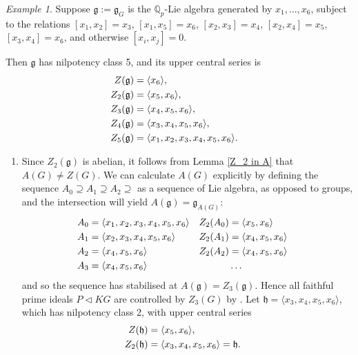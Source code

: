 \documentclass[12pt,a4paper]{article}
\let\\=\cr
\theoremstyle{definition}
\theoremstyle{remark}
\newtheorem{ex}[thm]{Example}
\theoremstyle{custthm}
\newcommand{\red}[1]{\textcolor{red!70!black}{\marginnote{\hspace{20pt}\dangertriangle}#1}}
\newcommand\dangertriangle{%
 \makebox[1.4em][c]{%
 \makebox[0pt][c]{\raisebox{.1em}{\small{\textbf{!}}}}%
 \makebox[0pt][c]{\Large$\bigtriangleup$}}}%
\begin{document}

\begin{ex}
Suppose $\mathfrak{g}:=\mathfrak{g}_G$ is the $\mathbb{Q}_p$-Lie algebra generated by $x_1, \dots, x_6$, subject to the relations 
$[x_1,x_2] = x_3$, $[x_1,x_5] = x_6$, $[x_2,x_3] = x_4$, $[x_2,x_4] = x_5$, $[x_3,x_4] = x_6$, and otherwise $[x_i, x_j] = 0$.

Then $\mathfrak{g}$ has nilpotency class 5, and its upper central series is
\begin{align*}
Z(\mathfrak{g}) &= \langle x_6\rangle,\\
Z_2(\mathfrak{g}) &= \langle x_5,x_6\rangle,\\
Z_3(\mathfrak{g}) &= \langle x_4,x_5,x_6\rangle,\\
Z_4(\mathfrak{g}) &= \langle x_3,x_4,x_5,x_6\rangle,\\
Z_5(\mathfrak{g}) &= \langle x_1,x_2,x_3,x_4,x_5,x_6\rangle.
\end{align*}
%

\begin{enumerate}[label=(\roman*)]
\item Since $Z_2(\mathfrak{g})$ is abelian, it follows from Lemma \ref{Z_2 in A} that $A(G)\neq Z(G)$. We can calculate $A(G)$ explicitly by defining the sequence $A_0\supseteq A_1\supseteq A_2\supseteq$ as a sequence of Lie algebra, as opposed to groups, and the intersection will yield $A(\mathfrak{g})=\mathfrak{g}_{A(G)}$:
%
\begin{align*}
A_0 &= \langle x_1,x_2,x_3,x_4,x_5,x_6\rangle &
Z_2(A_0) &= \langle x_5,x_6\rangle \\
A_1 &= \langle x_2,x_3,x_4,x_5,x_6\rangle &
Z_2(A_1) &= \langle x_4,x_5,x_6\rangle \\
A_2 &= \langle x_4,x_5,x_6\rangle &
Z_2(A_2) &= \langle x_4,x_5,x_6\rangle \\
A_3 &= \langle x_4,x_5,x_6\rangle && \dots
\end{align*}
%
and so the sequence has stabilised at $A(\mathfrak{g}) = Z_3(\mathfrak{g})$. Hence all faithful prime ideals $P\lhd KG$ are controlled by $Z_3(G)$ by \cite[Theorem B]{jones-primitive-ideals}. Let $\mathfrak{h} = \langle x_3, x_4, x_5, x_6\rangle$, which has nilpotency class 2, with upper central series  %
\begin{align*}
Z(\mathfrak{h}) &= \langle x_5, x_6\rangle,\\
Z_2(\mathfrak{h}) &= \langle x_3,x_4,x_5,x_6\rangle=\mathfrak{h}.
\end{align*}


\end{enumerate}
\end{ex}
\end{document}
